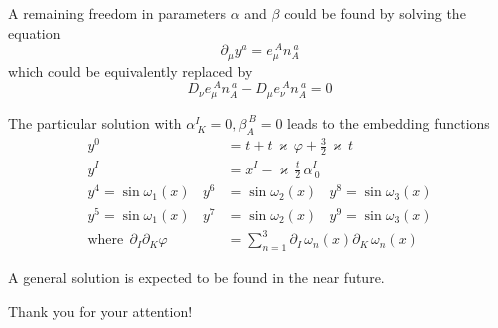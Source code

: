 \documentclass[serif,professionalfonts]{beamer}
\begin{document}
\begin{frame}
	A remaining freedom in parameters $\alpha$ and $\beta$ could be found by solving the equation
\begin{equation}
	\partial_{\mu} y^a = e_{\mu}^{\ A} n_{A}^{\ a}
\end{equation}
which could be equivalently replaced by
\begin{equation}
	D_{\nu} e_{\mu}^{\ A} n_{A}^{\ a} - D_{\mu} e_{\nu}^{\ A} n_{A}^{\ a} = 0
\end{equation}

The particular solution with $\alpha^{I}_{\ K} = 0, \beta_{A}^{\ B} = 0$ leads to the embedding functions
\begin{align}
	y^0 &= t + t \, \varkappa \, \varphi + \frac{3}{2} \, \varkappa \, t \nonumber \\
	y^{I} &= x^{I} - \varkappa \, \frac{t}{2} \, \alpha^{I}_{\ 0} \nonumber \\
	y^4 = \sin{\omega_1(x)} \ \ \ \ y^6 &= \sin{\omega_2(x)} \ \ \ \ y^8 = \sin{\omega_3(x)} \\
	y^5 = \sin{\omega_1(x)} \ \ \ \ y^7 &= \sin{\omega_2(x)} \ \ \ \ y^9 = \sin{\omega_3(x)} \nonumber \\
	\text{where} \ \  \partial_I \partial_K \varphi &= \sum \limits_{n = 1}^{3} \partial_I \, \omega_n(x) \partial_K \, \omega_n(x) 
\end{align}

A general solution is expected to be found in the near future.
\end{frame}

\begin{frame}
\begin{center}
	\Large{Thank you for your attention!}
\end{center}
\end{frame}
\end{document}
